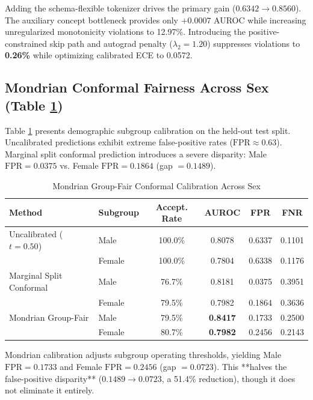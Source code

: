 \documentclass[journal]{IEEEtran}
\begin{document}
Adding the schema-flexible tokenizer drives the primary gain ($0.6342 \to 0.8560$). The auxiliary concept bottleneck provides only $+0.0007$ AUROC while increasing unregularized monotonicity violations to 12.97\%. Introducing the positive-constrained skip path and autograd penalty ($\lambda_2 = 1.20$) suppresses violations to \textbf{0.26\%} while optimizing calibrated ECE to 0.0572.

\subsection{Mondrian Conformal Fairness Across Sex (Table \ref{tab:mondrian_fairness})}
Table \ref{tab:mondrian_fairness} presents demographic subgroup calibration on the held-out test split. Uncalibrated predictions exhibit extreme false-positive rates ($\text{FPR} \approx 0.63$). Marginal split conformal prediction introduces a severe disparity: Male $\text{FPR} = 0.0375$ vs. Female $\text{FPR} = 0.1864$ (gap $= 0.1489$).

\begin{table}[t]
\caption{Mondrian Group-Fair Conformal Calibration Across Sex}
\label{tab:mondrian_fairness}
\centering
\begin{tabular}{llcccc}
\toprule
\textbf{Method} & \textbf{Subgroup} & \textbf{Accept. Rate} & \textbf{AUROC} & \textbf{FPR} & \textbf{FNR} \\
\midrule
Uncalibrated ($t=0.50$) & Male   & 100.0\% & 0.8078 & 0.6337 & 0.1101 \\
                         & Female & 100.0\% & 0.7804 & 0.6338 & 0.1176 \\
\midrule
Marginal Split Conformal & Male   & 76.7\%  & 0.8181 & 0.0375 & 0.3951 \\
                         & Female & 79.5\%  & 0.7982 & 0.1864 & 0.3636 \\
\midrule
Mondrian Group-Fair      & Male   & 79.5\%  & \textbf{0.8417} & 0.1733 & 0.2500 \\
                         & Female & 80.7\%  & \textbf{0.7982} & 0.2456 & 0.2143 \\
\bottomrule
\end{tabular}
\end{table}

Mondrian calibration adjusts subgroup operating thresholds, yielding Male $\text{FPR} = 0.1733$ and Female $\text{FPR} = 0.2456$ (gap $= 0.0723$). This **halves the false-positive disparity** ($0.1489 \to 0.0723$, a 51.4\% reduction), though it does not eliminate it entirely.
\end{document}
